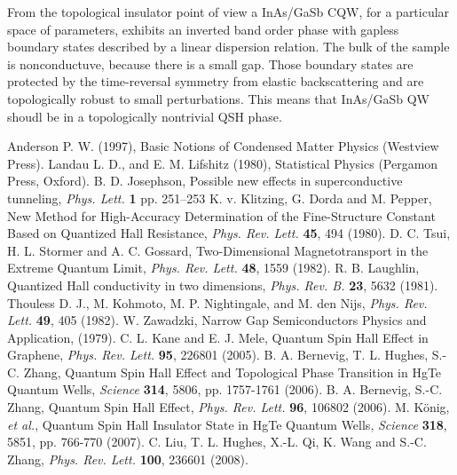 \documentclass[titlepage,a4paper]{book}
\begin{document}
From the topological insulator point of view a InAs/GaSb CQW, for a particular space of parameters, exhibits an inverted band order phase with gapless boundary states described by a linear dispersion relation. The bulk of the sample is nonconductuve, because there is a small gap. Those boundary states are protected by the time-reversal symmetry from elastic backscattering and are topologically robust to small perturbations. This means that InAs/GaSb QW shoudl be in a topologically nontrivial QSH phase.





\begin{thebibliography}{99}
Anderson P. W. (1997), Basic Notions of Condensed Matter Physics (Westview Press).
Landau L. D., and E. M. Lifshitz (1980), Statistical Physics (Pergamon Press, Oxford).
B. D. Josephson, Possible new effects in superconductive tunneling, \textit{Phys. Lett.} \textbf{1} pp. 251–253 
K. v. Klitzing, G. Dorda and M. Pepper, New Method for High-Accuracy Determination of the Fine-Structure Constant Based on Quantized Hall Resistance, \textit{Phys. Rev. Lett.} \textbf{45}, 494 (1980).
D. C. Tsui, H. L. Stormer and A. C. Gossard, Two-Dimensional Magnetotransport in the Extreme Quantum Limit, \textit{Phys. Rev. Lett.} \textbf{48}, 1559 (1982).
R. B. Laughlin, Quantized Hall conductivity in two dimensions, \textit{Phys. Rev. B.} \textbf{23}, 5632 (1981).
Thouless D. J., M. Kohmoto, M. P. Nightingale, and M. den Nijs, \textit{Phys. Rev. Lett.} \textbf{49}, 405 (1982).
W. Zawadzki, Narrow Gap Semiconductors Physics and Application, (1979).
C. L. Kane and E. J. Mele, Quantum Spin Hall Effect in Graphene, \textit{Phys. Rev. Lett.} \textbf{95}, 226801 (2005).
B. A. Bernevig, T. L. Hughes, S.-C. Zhang, Quantum Spin Hall Effect and Topological Phase Transition in HgTe Quantum Wells, \textit{Science} \textbf{314}, 5806, pp. 1757-1761 (2006).
B. A. Bernevig, S.-C. Zhang, Quantum Spin Hall Effect, \textit{Phys. Rev. Lett.} \textbf{96}, 106802 (2006).
M. König, \textit{et al.}, Quantum Spin Hall Insulator State in HgTe Quantum Wells, \textit{Science} \textbf{318}, 5851, pp. 766-770 (2007).
C. Liu, T. L. Hughes, X.-L. Qi, K. Wang and S.-C. Zhang, \textit{Phys. Rev. Lett.} \textbf{100}, 236601 (2008).

\end{thebibliography}
\end{document}
